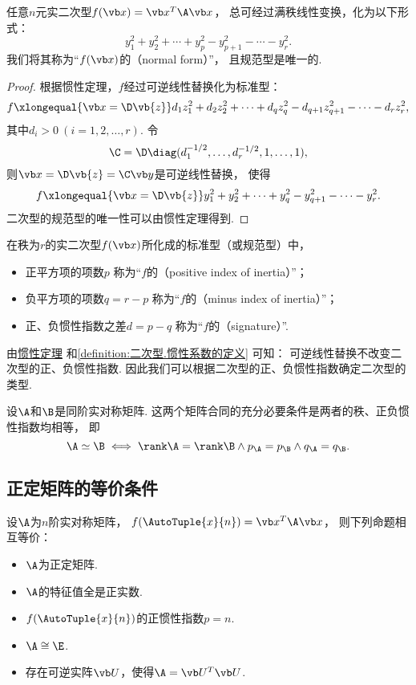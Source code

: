 \begin{corollary}
任意\(n\)元实二次型\(f(\x) = \x^T\A\x\)，
总可经过满秩线性变换，化为以下形式：\[
	y_1^2+y_2^2+ \dotsb +y_p^2
	-y_{p+1}^2-\dotsb-y_r^2.
\]
我们将其称为“\(f(\x)\)的（{\rm normal form}）”，
且规范型是唯一的.
\begin{proof}
根据惯性定理，\(f\)经过可逆线性替换化为标准型：\[
	f \xlongequal{\x=\D\vb{z}}
	d_1 z_1^2 + d_2 z_2^2 + \dotsb + d_q z_q^2 - d_{q+1} z_{q+1}^2 - \dotsb - d_r z_r^2,
\]
其中\(d_i>0\ (i=1,2,\dotsc,r)\).
令\[
	\C = \D \diag(d_1^{-1/2},\dotsc,d_r^{-1/2},1,\dotsc,1),
\]
则\(\x = \D\vb{z} = \C\y\)是可逆线性替换，
使得\[
	f \xlongequal{\x=\D\vb{z}} y_1^2 + y_2^2 + \dotsb + y_q^2 - y_{q+1}^2 - \dotsb - y_r^2.
\]
二次型的规范型的唯一性可以由惯性定理得到.
\end{proof}
\end{corollary}

\begin{definition}\label{definition:二次型.惯性系数的定义}
在秩为\(r\)的实二次型\(f(\x)\)所化成的标准型（或规范型）中，
\begin{itemize}
	\item 正平方项的项数\(p\)
	称为“\(f\)的（positive index of inertia）”；
	\item 负平方项的项数\(q=r-p\)
	称为“\(f\)的（minus index of inertia）”；
	\item 正、负惯性指数之差\(d=p-q\)
	称为“\(f\)的（signature）”.
\end{itemize}
\end{definition}
由\hyperref[theorem:二次型.惯性定理]{惯性定理}%
和\cref{definition:二次型.惯性系数的定义} 可知：
可逆线性替换不改变二次型的正、负惯性指数.
因此我们可以根据二次型的正、负惯性指数确定二次型的类型.

\begin{theorem}
设\(\A\)和\(\B\)是同阶实对称矩阵.
这两个矩阵合同的充分必要条件是两者的秩、正负惯性指数均相等，
即\[
	\A\simeq\B
	\iff
	\rank\A=\rank\B \land p_{\A}=p_{\B} \land q_{\A}=q_{\B}.
\]
\end{theorem}

\subsection{正定矩阵的等价条件}
\begin{theorem}
设\(\A\)为\(n\)阶实对称矩阵，
\(f(\AutoTuple{x}{n}) = \x^T\A\x\)，
则下列命题相互等价：\begin{itemize}
	\item \(\A\)为正定矩阵.
	\item \(\A\)的特征值全是正实数.
	\item \(f(\AutoTuple{x}{n})\)的正惯性指数\(p=n\).
	\item \(\A \cong \E\).
	\item 存在可逆实阵\(\P\)，使得\(\A=\P^T\P\).
\end{itemize}
\end{theorem}

